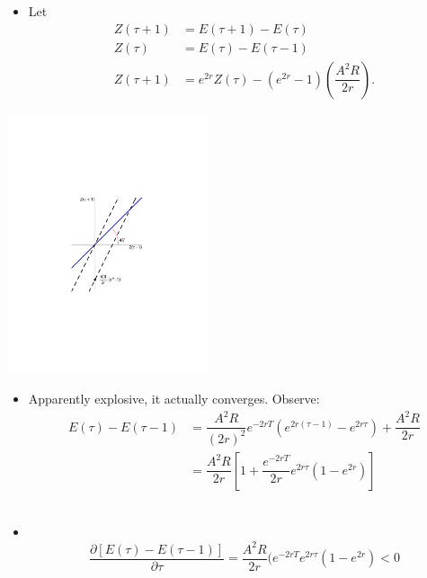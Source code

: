 \documentclass[12pt,compress,handout]{beamer}  %
\begin{document}
\begin{frame}
\begin{itemize}
\item Let
\begin{align*}
Z(\tau +1)& =E(\tau +1)-E(\tau )\\[3mm]
Z(\tau )& =E(\tau )-E(\tau -1)\\[3mm]
Z(\tau +1)& =e^{2r}Z(\tau )-(e^{2r}-1)\left( \dfrac{A^{2}R}{2r}\right) \text{.}
\end{align*}
\end{itemize}
\end{frame}


\begin{frame}

\begin{center}
\includegraphics[height=3.0in]{include/fig-explode-converge}
\end{center}

\end{frame}


\begin{frame}

\begin{itemize}
\item Apparently explosive, it actually converges. Observe:
\begin{align*}
    E(\tau )-E(\tau -1)
    &= \dfrac{A^{2}R}{(2r)^{2}}e^{-2rT}(e^{2r(\tau -1)}-e^{2r\tau })
        +\dfrac{A^{2}R}{2r}\\[3mm]
    &=\dfrac{A^{2}R}{2r}\left[
        1+\dfrac{e^{-2rT}}{2r}e^{2r\tau }(1-e^{2r})
    \right]
\end{align*}\ \\[6mm]
\item \ \\[-11mm]
\begin{equation*}
\dfrac{\partial [E(\tau )-E(\tau -1)]}{\partial \tau
}=\dfrac{A^{2}R}{2r}(e^{-2rT}e^{2r\tau }(1-e^{2r})<0
\end{equation*}
\end{itemize}
\end{frame}
\end{document}
